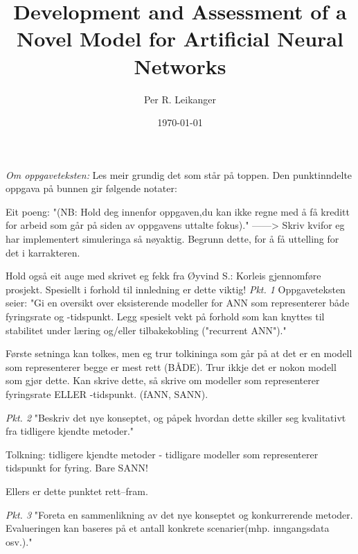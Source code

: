 \documentclass[a4paper,11 pt]{report}
\author{Per R. Leikanger}
\title{Development and Assessment of a Novel Model for Artificial Neural Networks}
\date{\today}
\begin{document}
   

\maketitle




\emph{Om oppgaveteksten:}
Les meir grundig det som står på toppen. Den punktinndelte oppgava på bunnen gir følgende notater:

Eit poeng: "(NB: Hold deg innenfor oppgaven,du kan ikke regne med å få
kreditt for arbeid som går på siden av oppgavens uttalte fokus)."
------> Skriv kvifor eg har implementert simuleringa så nøyaktig. Begrunn dette, for å få uttelling for det i karrakteren. 

Hold også eit auge med skrivet eg fekk fra Øyvind S.: Korleis gjennomføre prosjekt. Spesiellt i forhold til innledning er dette viktig!
	\emph{Pkt. 1}
Oppgaveteksten seier: "Gi en oversikt over eksisterende modeller for ANN som representerer både fyringsrate og -tidspunkt. 
Legg spesielt vekt på forhold som kan knyttes til stabilitet under læring og/eller tilbakekobling ("recurrent ANN")."

Første setninga kan tolkes, men eg trur tolkininga som går på at det er en modell som representerer begge er mest rett (BÅDE). 
Trur ikkje det er nokon modell som gjør dette. Kan skrive dette, så skrive om modeller som representerer fyringsrate ELLER -tidspunkt. (fANN, SANN).


	\emph{Pkt. 2}
"Beskriv det nye konseptet, og påpek hvordan dette skiller seg kvalitativt fra tidligere kjendte metoder."

Tolkning: tidligere kjendte metoder - tidligare modeller som representerer tidspunkt for fyring. Bare SANN!

Ellers er dette punktet rett--fram.

	\emph{Pkt. 3}
"Foreta en sammenlikning av det nye konseptet og konkurrerende metoder. Evalueringen kan baseres på et antall konkrete scenarier(mhp. inngangsdata osv.)."
\end{document}
